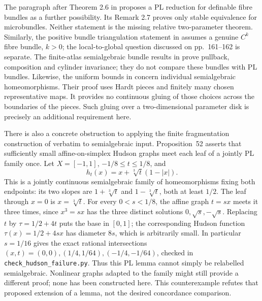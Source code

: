 The paragraph after Theorem 2.6 in
\cite[p.~35]{Shiota2010} proposes a PL reduction for definable
fibre bundles as a further possibility. Its Remark 2.7 proves
only stable equivalence for microbundles. Neither statement is
the missing relative two-parameter theorem. Similarly, the positive
bundle triangulation statement in \cite[p.~160]{MurayamaShiota2013}
assumes a genuine $C^k$ fibre bundle, $k>0$; the local-to-global
question discussed on pp.~161--162 is separate.
The finite-atlas semialgebraic bundle results in
\cite[Definition~8.1 and Propositions~8.4--8.5, Lemmas~8.7--8.8,
pp.~2529--2532]{HardtLambrechtsTurchinVolic2011} prove pullback,
composition and cylinder invariance; they do not compare these bundles
with PL bundles. Likewise, the uniform bounds in
\cite[Proposition~3.6 and Theorem~3.8, pp.~1582--1585;
Theorem~7.3, pp.~1595--1596]{DemdahKartoue2011} concern individual
semialgebraic homeomorphisms. Their proof uses Hardt pieces and finitely
many chosen representative maps. It provides no continuous gluing of
those choices across the boundaries of the pieces. Such gluing over a
two-dimensional parameter disk is precisely an additional requirement
here.

There is also a concrete obstruction to applying the finite
fragmentation construction of \cite[Proposition~52, pp.~84--85;
Lemma~12, pp.~90--93]{Mnev2007} verbatim to semialgebraic input.
Proposition~52 asserts that sufficiently small affine-on-simplex
Hudson graphs meet each leaf of a jointly PL family once. Let
$X=[-1,1]$, $-1/8\le t\le1/8$, and
\[
 h_t(x)=x+\sqrt[3]{t}(1-|x|).
\]
This is a jointly continuous semialgebraic family of homeomorphisms
fixing both endpoints: its two slopes are $1+\sqrt[3]{t}$ and
$1-\sqrt[3]{t}$, both at least $1/2$. The leaf through $x=0$ is
$x=\sqrt[3]{t}$. For every $0<s<1/8$, the affine graph $t=sx$
meets it three times, since $x^3=sx$ has the three distinct
solutions $0,\sqrt{s},-\sqrt{s}$. Replacing $t$ by
$\tau=1/2+4t$ puts the base in $[0,1]$; the corresponding Hudson
function $\tau(x)=1/2+4sx$ has diameter $8s$, which is
arbitrarily small. In particular $s=1/16$ gives the exact rational
intersections $(x,t)=(0,0),(1/4,1/64),(-1/4,-1/64)$, checked in
\texttt{check\_hudson\_failure.py}. Thus this PL lemma cannot
simply be relabelled semialgebraic. Nonlinear graphs adapted to the
family might still provide a different proof; none has been
constructed here. This counterexample refutes that proposed
extension of a lemma, not the desired concordance comparison.

